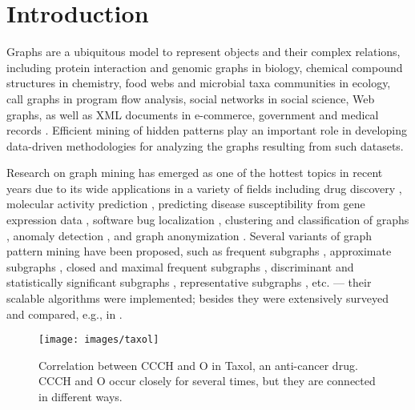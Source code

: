 \chapter{Introduction}
\label{sec:intro}

Graphs are a ubiquitous model to represent objects and their complex relations, including protein interaction and genomic graphs in biology,
chemical compound structures in chemistry, food webs and microbial taxa communities in ecology, call graphs in program flow analysis,
social networks in social science, Web graphs, as well as XML documents in e-commerce, government and medical records \cite{SH12}.
Efficient mining of hidden patterns play an important role in developing data-driven methodologies for analyzing the graphs
resulting from such datasets.

Research on graph mining has emerged as one of the hottest topics in recent years due to its wide applications in a variety of fields including
drug discovery \cite{KK01,NK05,YH02}, molecular activity prediction \cite{JYW10,TCG09},
predicting disease susceptibility from gene expression data \cite{RHS13,DI11}, software bug localization \cite{CLZWY09},
clustering and classification of graphs \cite{DKWK05,YCHY08}, anomaly detection \cite{ATK15}, and graph anonymization \cite{LAW11}.
Several variants of graph pattern mining have been proposed,
such as frequent subgraphs \cite{YH02,EASK14}, approximate subgraphs \cite{KYW10}, closed and maximal frequent subgraphs \cite{HWPY04,YH03},
discriminant and statistically significant subgraphs \cite{TCG09,RS09,YCHY08}, representative subgraphs \cite{CHSBZ08,ZYL09}, etc. --- their scalable algorithms
were implemented; besides they were extensively surveyed and compared, e.g., in \cite{HCXY07,WMFP05,AW10,KR17}.
%
\begin{figure}
\centering
\texttt{[image: images/taxol]}
\vspace{-2mm}
\caption{\scriptsize Correlation between {\sf CCCH} and {\sf O} in {\sf Taxol}, an anti-cancer drug. {\sf CCCH} and {\sf O}
occur closely for several times, but they are connected in different ways.}
\label{fig:taxol}
\vspace{-6mm}
\end{figure}
%

